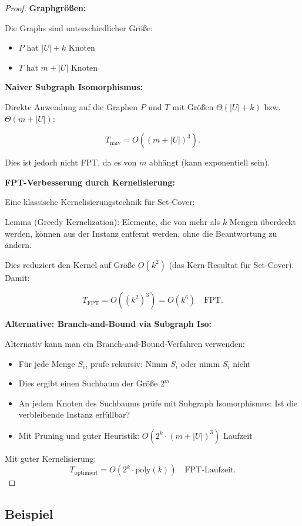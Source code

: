 ﻿\documentclass[a4paper,12pt]{article}
\theoremstyle{definition}
\begin{document}
\begin{proof}
	\textbf{Graphgrößen:}
	
	Die Graphs sind unterschiedlicher Größe:
	\begin{itemize}
		\item $P$ hat $|U| + k$ Knoten
		\item $T$ hat $m + |U|$ Knoten
	\end{itemize}
	
	\textbf{Naiver Subgraph Isomorphismus:}
	
	Direkte Anwendung auf die Graphen $P$ und $T$ mit Größen $\Theta(|U| + k)$ bzw. $\Theta(m + |U|)$:
	
	\[
	T_{\text{naiv}} = O((m + |U|)^3).
	\]
	
	Dies ist jedoch nicht FPT, da es von $m$ abhängt (kann exponentiell sein).
	
	\textbf{FPT-Verbesserung durch Kernelisierung:}
	
	Eine klassische Kernelisierungstechnik für Set-Cover:
	
	Lemma (Greedy Kernelization): Elemente, die von mehr als $k$ Mengen überdeckt werden, können aus der Instanz entfernt werden, ohne die Beantwortung zu ändern.
	
	Dies reduziert den Kernel auf Größe $O(k^2)$ (das Kern-Resultat für Set-Cover). Damit:
	
	\[
	T_{\text{FPT}} = O((k^2)^3) = O(k^6) \quad \text{FPT.}
	\]
	
	\textbf{Alternative: Branch-and-Bound via Subgraph Iso:}
	
	Alternativ kann man ein Branch-and-Bound-Verfahren verwenden:
	\begin{itemize}
		\item Für jede Menge $S_i$, prufe rekursiv: Nimm $S_i$ oder nimm $S_i$ nicht
		\item Dies ergibt einen Suchbaum der Größe $2^m$
		\item An jedem Knoten des Suchbaums prüfe mit Subgraph Isomorphismus: Ist die verbleibende Instanz erfüllbar?
		\item Mit Pruning und guter Heuristik: $O(2^k \cdot (m + |U|)^3)$ Laufzeit
	\end{itemize}
	
	Mit guter Kernelisierung:
	\[
	T_{\text{optimiert}} = O(2^k \cdot \text{poly}(k)) \quad \text{FPT-Laufzeit}.
	\]
\end{proof}

\subsection{Beispiel}
\end{document}

